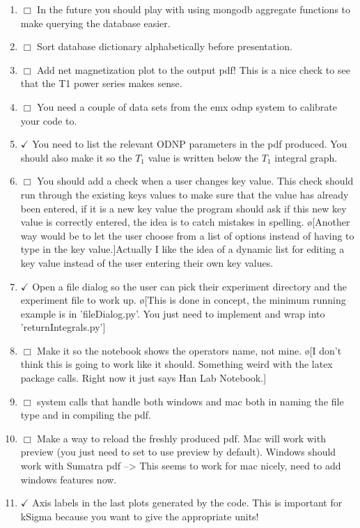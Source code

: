 \documentclass[10pt]{book}
\begin{document}
\begin{enumerate}
    \item $\Box$ In the future you should play with using mongodb aggregate functions to make querying the database easier.
    \item $\Box$ Sort database dictionary alphabetically before presentation.
    \item $\Box$ Add net magnetization plot to the output pdf! This is a nice check to see that the T1 power series makes sense.
    \item $\Box$ You need a couple of data sets from the emx odnp system to calibrate your code to.
    \item $\checkmark$ You need to list the relevant ODNP parameters in the pdf produced. You should also make it so the $T_1$ value is written below the $T_1$ integral graph.
    \item $\Box$ You should add a check when a user changes key value. This check should run through the existing keys values to make sure that the value has already been entered, if it is a new key value the program should ask if this new key value is correctly entered, the idea is to catch mistakes in spelling. \o[Another way would be to let the user choose from a list of options instead of having to type in the key value.]{Actually I like the idea of a dynamic list for editing a key value instead of the user entering their own key values.}
    \item $\checkmark$ Open a file dialog so the user can pick their experiment directory and the experiment file to work up. \o[This is done in concept, the minimum running example is in 'fileDialog.py'. You just need to implement and wrap into 'returnIntegrals.py']{}
    \item $\Box$ Make it so the notebook shows the operators name, not mine. \o[I don't think this is going to work like it should. Something weird with the latex package calls. Right now it just says Han Lab Notebook.]{}
    \item $\Box$ system calls that handle both windows and mac both in naming the file type and in compiling the pdf.
    \item $\Box$ Make a way to reload the freshly produced pdf. Mac will work with preview (you just need to set to use preview by default). Windows should work with Sumatra pdf --> This seems to work for mac nicely, need to add windows features now.
    \item $\checkmark$ Axis labels in the last plots generated by the code. This is important for kSigma because you want to give the appropriate units!

\end{enumerate}
\end{document}
